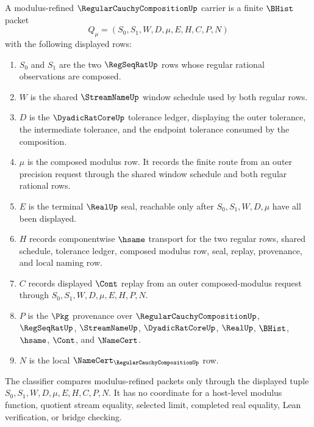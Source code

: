 \begin{definition}\label{def:regular-cauchy-composition-modulus-carrier}
A modulus-refined $\RegularCauchyCompositionUp$ carrier is a finite $\BHist$ packet
$$
Q_\mu=(S_0,S_1,W,D,\mu,E,H,C,P,N)
$$
with the following displayed rows:
\begin{enumerate}
\item $S_0$ and $S_1$ are the two $\RegSeqRatUp$ rows whose regular rational observations are composed.
\item $W$ is the shared $\StreamNameUp$ window schedule used by both regular rows.
\item $D$ is the $\DyadicRatCoreUp$ tolerance ledger, displaying the outer tolerance, the intermediate tolerance, and the endpoint tolerance consumed by the composition.
\item $\mu$ is the composed modulus row. It records the finite route from an outer precision request through the shared window schedule and both regular rational rows.
\item $E$ is the terminal $\RealUp$ seal, reachable only after $S_0,S_1,W,D,\mu$ have all been displayed.
\item $H$ records componentwise $\hsame$ transport for the two regular rows, shared schedule, tolerance ledger, composed modulus row, seal, replay, provenance, and local naming row.
\item $C$ records displayed $\Cont$ replay from an outer composed-modulus request through $S_0,S_1,W,D,\mu,E,H,P,N$.
\item $P$ is the $\Pkg$ provenance over $\RegularCauchyCompositionUp$, $\RegSeqRatUp$, $\StreamNameUp$, $\DyadicRatCoreUp$, $\RealUp$, $\BHist$, $\hsame$, $\Cont$, and $\NameCert$.
\item $N$ is the local $\NameCert_{\RegularCauchyCompositionUp}$ row.
\end{enumerate}
The classifier compares modulus-refined packets only through the displayed tuple $S_0,S_1,W,D,\mu,E,H,C,P,N$. It has no coordinate for a host-level modulus function, quotient stream equality, selected limit, completed real equality, Lean verification, or bridge checking.
\end{definition}

